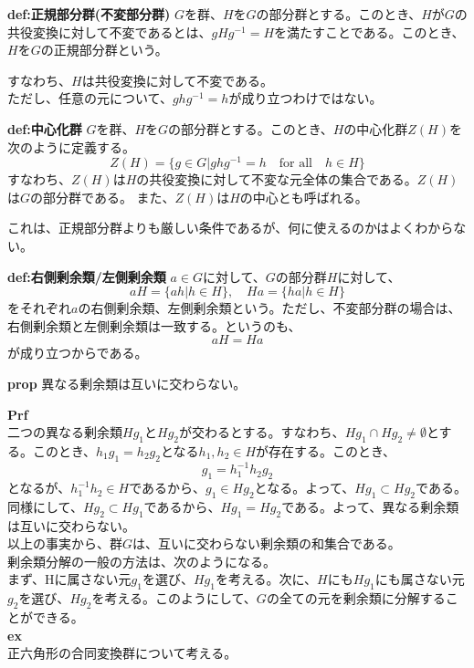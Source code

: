 \documentclass[a4paper,11pt]{jsarticle}
\begin{document}
\begin{itembox}[l]{\textbf{def:正規部分群(不変部分群)}}
    $G$を群、$H$を$G$の部分群とする。このとき、$H$が$G$の共役変換に対して不変であるとは、$gHg^{-1} = H$を満たすことである。このとき、$H$を$G$の正規部分群という。

\end{itembox}
すなわち、$H$は共役変換に対して不変である。\\
ただし、任意の元について、$ghg^{-1}=h$が成り立つわけではない。\\

\begin{itembox}[l]{\textbf{def:中心化群}}
    $G$を群、$H$を$G$の部分群とする。このとき、$H$の中心化群$Z(H)$を次のように定義する。
    \begin{equation}
        Z(H) = \{g \in G | ghg^{-1} = h \quad \text{for all} \quad h \in H\}
    \end{equation}
    すなわち、$Z(H)$は$H$の共役変換に対して不変な元全体の集合である。$Z(H)$は$G$の部分群である。
    また、$Z(H)$は$H$の中心とも呼ばれる。
\end{itembox}
これは、正規部分群よりも厳しい条件であるが、何に使えるのかはよくわからない。\\

\begin{itembox}[l]{\textbf{def:右側剰余類/左側剰余類}}
    $a \in G$に対して、$G$の部分群$H$に対して、
    \begin{equation}
        aH = \{ah | h \in H\}, \quad Ha = \{ha | h \in H\}
    \end{equation}
    をそれぞれ$a$の右側剰余類、左側剰余類という。ただし、不変部分群の場合は、右側剰余類と左側剰余類は一致する。というのも、
    \begin{equation}
        aH = Ha
    \end{equation}
    が成り立つからである。

\end{itembox}
\begin{itembox}[l]{\textbf{prop}}
異なる剰余類は互いに交わらない。
\end{itembox}
\textbf{Prf}\\
二つの異なる剰余類$Hg_1$と$Hg_2$が交わるとする。すなわち、$Hg_1 \cap Hg_2 \neq \emptyset$とする。このとき、$h_1g_1 = h_2g_2$となる$h_1,h_2 \in H$が存在する。このとき、
\begin{equation}
    g_1 = h_1^{-1}h_2g_2
\end{equation}
となるが、$h_1^{-1}h_2 \in H$であるから、$g_1 \in Hg_2$となる。よって、$Hg_1 \subset Hg_2$である。同様にして、$Hg_2 \subset Hg_1$であるから、$Hg_1 = Hg_2$である。よって、異なる剰余類は互いに交わらない。\\
以上の事実から、群$G$は、互いに交わらない剰余類の和集合である。\\
剰余類分解の一般の方法は、次のようになる。\\
まず、Hに属さない元$g_1$を選び、$Hg_1$を考える。次に、$H$にも$Hg_1$にも属さない元$g_2$を選び、$Hg_2$を考える。このようにして、$G$の全ての元を剰余類に分解することができる。\\
\textbf{ex}\\
正六角形の合同変換群について考える。\\
\end{document}
